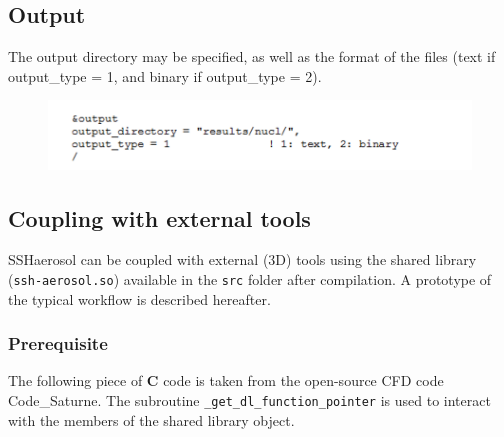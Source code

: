\documentclass[a4paper,11pt]{article}
\begin{document}
\subsection{Output}

The output directory may be specified, as well as the format of the files (text if output\_type = 1, and binary if output\_type = 2).
 
\begin{figure}[H]
        \begin{center}
                \includegraphics[angle=0,width=\textwidth]{fig/output.png}
        \end{center}
\end{figure}

\subsection{Coupling with external tools}

SSHaerosol can be coupled with external (3D) tools using the shared library (\texttt{ssh-aerosol.so}) available in the \texttt{src} folder after compilation.
A prototype of the typical workflow is described hereafter.

\subsubsection*{Prerequisite}

The following piece of \textbf{C} code is taken from the open-source CFD code Code\_Saturne.
The subroutine \texttt{\_get\_dl\_function\_pointer} is used to interact with the members of the shared library object.
\end{document}

